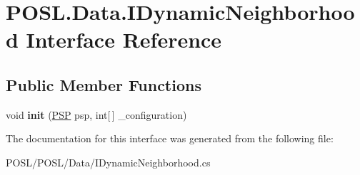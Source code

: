 \hypertarget{interfacePOSL_1_1Data_1_1IDynamicNeighborhood}{}\section{P\+O\+S\+L.\+Data.\+I\+Dynamic\+Neighborhood Interface Reference}
\label{interfacePOSL_1_1Data_1_1IDynamicNeighborhood}
\subsection*{Public Member Functions}
\begin{DoxyCompactItemize}
\item 
\mbox{\label{interfacePOSL_1_1Data_1_1IDynamicNeighborhood_ae30f8372a0f40fc8a4401377c1d7e126}} 
void {\bfseries init} (\hyperlink{classPOSL_1_1Solver_1_1PSP}{P\+SP} psp, int\mbox{[}$\,$\mbox{]} \+\_\+configuration)
\end{DoxyCompactItemize}


The documentation for this interface was generated from the following file\+:\begin{DoxyCompactItemize}
\item 
P\+O\+S\+L/\+P\+O\+S\+L/\+Data/I\+Dynamic\+Neighborhood.\+cs\end{DoxyCompactItemize}
